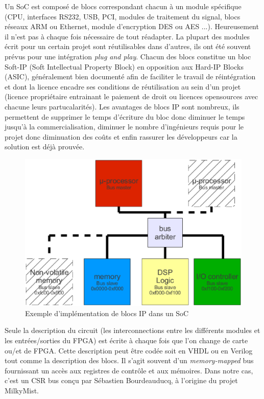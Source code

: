 \vspace{15px}

Un SoC est composé de blocs correspondant chacun à un module spécifique (CPU, interfaces RS232, USB, PCI, modules de traitement du signal, blocs réseaux ARM ou Ethernet, module d'encryption DES ou AES ...). Heureusement il n'est pas à chaque fois nécessaire de tout réadapter. La plupart des modules écrit pour un certain projet sont réutilisables dans d'autres, ils ont été souvent prévus pour une intégration \textit{plug and play}. Chacun des blocs constitue un bloc Soft-IP (Soft Intellectual Property Block) en opposition aux Hard-IP Blocks (ASIC), généralement bien documenté afin de faciliter le travail de réintégration et dont la licence encadre ses conditions de réutilisation au sein d'un projet (licence propriétaire entrainant le paiement de droit ou licences opensources avec chacune leurs partucalarités). Les avantages de blocs IP sont nombreux, ils permettent de supprimer le temps d'écriture du bloc donc diminuer le temps jusqu'à la commercialisation, diminuer le nombre d'ingénieurs requis pour le projet donc diminuation des coûts  et enfin rassurer les développeurs car la solution est déjà prouvée.
\medskip

\begin{figure}
\begin{center}
\includegraphics[scale=0.4]{soc_arch.eps}
\end{center}
\caption{Exemple d'implémentation de blocs IP dans un SoC}
\end{figure}

Seule la description du circuit (les interconnections entre les différents modules et les entrées/sorties du FPGA) est écrite à chaque fois que l'on change de carte ou/et de FPGA. Cette description peut être codée soit en VHDL ou en Verilog tout comme la description des blocs. Il s'agit souvent d'un \textit{memory-mapped} bus fournissant un accès aux registres de contrôle et aux mémoires. Dans notre cas, c'est un CSR bus conçu par Sébastien Bourdeauducq, à l'origine du projet MilkyMist.
\medskip

